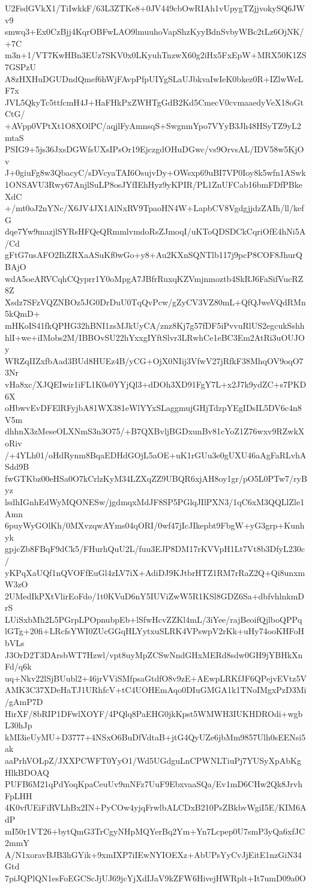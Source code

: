 U2FsdGVkX1/TiIwkkF/63L3ZTKe8+0JV449cbOwRIAh1vUpygTZjjvokySQ6JWv9
smwq3+Ex0CzBjj4KqrOBFwLAO9lmuuhoVapShzKyyBdnSvbyWBc2tLz6OjNK/+7C
m3n+1/VT7KwHBn3EUz7SKV0x0LKyuhTnzwX60g2iHx5FxEpW+MRX50K1ZS7GSPzU
A8zHXHuDGUDndQmef6hWjFAvpPfpUIYgSLaUJbkvaIwIeK0bkez0R+IZlwWeLF7x
JVL5QkyTc5ttfcmH4J+HaFHkPxZWHTgGdB2Kd5CmecV0cvmaaedyVeX18oGtCtG/
+AVpp0VPtXt1O8XOlPC/aqjlFyAmnsqS+SwgnmYpo7VYyB3Jh48HSyTZ9yL2mtaS
PSIG9+5js36JxsDGWfsUXsIPsOr19EjczgdOHuDGwc/vs9OrvsAL/IDV58w5KjOv
J+0giuFg8w3QbacyC/sDVcyaTAI6OsujvDy+OWsxp69uBI7VP0Ioy8k5wfn1ASwk
1ONSAVU3Rwy67AnjlSuLP8osJYfIEhHyz9yKPIR/PL1ZnUFCab16bmFDfPBkeXdC
+/mt0oJ2nYNc/X6JV4JX1AlNxRV9TpaoHN4W+LapbCV8VgdgjjdzZAIh/ll/kefG
dqe7Yw9mazjlSYRsHFQeQRmmlvmdoRsZJmoqI/uKToQDSDCkCqriOfE4hNi5A/Cd
gFtG7usAFO2IhZRXaASuKf0wGo+y8+Au2KXnSQNTlb117j9pcP8COF8JhurQBAjO
wdA5oeARVCqhCQyprr1Y0oMpgA7JBfrRuxqKZVmjnmoztb4SkRJ6FaSifVucRZ8Z
Xsdz7SFzVQZNBOz5JG0DrDuU0TqQvPcw/gZyCV3VZ80mL+QfQJweVQdRMn5kQmD+
mHKoIS41fkQPHG32hBNI1zsMJkUyCA/znz8Kj7g57fDF5iPvvuRlUS2egcukSshh
hlI+we+iIMobs2M/IBBOvSU22hYxxgIYftSlvr3LRwhCe1eBC3Em2AtRi3uOUJOy
WRZqIIZxfbAad3BUd8HUEz4B/yCG+OjX0NIij3VfwV27jRfkF38MhqOV9oqO73Nr
vHa8xc/XJQEIwir1iFL1K0s0YYjQl3+dDOh3XD91FgY7L+x2J7k9ydZC+s7PKD6X
oHbwvEvDFElRFyjbA81WX381eWlYYxSLaggmujGHjTdzpYEgIDsIL5DV6c4n8V5m
dhhnX3zMeseOLXNmS3n3O75/+B7QXBvljBGDxunBv81cYoZ1Z76wxv9RZwkXoRiv
/+4YLh01/oHdRynm8BqaEDHdGOjL5aOE+uK1rGUu3e0gUXU46aAgFaRLvhASdd9B
fwGTKbz00eHSa0O7kCrlzKyM34LZXqZZ9UBQR6xjAH8oy1gr/pO5L0PTw7/ryByz
lsdhIGnhEdWyMQONESw/jgdmqxMdJF8SP5PGlqJIlPXN3/1qC6xM3QQLlZle1Amn
6puyWyGOlKh/0MXvzqwAYms04qORI/0wf47jIcJIkepbt9FbgW+yG3grp+Kunhyk
gpjcZb8FBqF9dCk5/FHurhQuU2L/fuu3EJP8DM17rKVVpH1Lt7Vt8b3DfyL230c/
yKPqXaUQf1nQVOFfEuGl4zLV7iX+AdiDJ9KJtbrHTZ1RM7rRaZ2Q+Qi8unxmW3zO
2UMedIkPXtVlirEoFdo/1t0KVuD6nY5IUViZwW5R1KSl8GDZ6Sa+dbfvhlnkmDrS
LUiSxbMh2L5PGrpLPOpnubpEb+lSfwHcvZZKl4mL/3iYee/rajBeoifQjlboQPPq
lGTg+20fi+LRcfsYWI0ZUcGGqHLYytxuSLRK4VPswpV2rKk+uHy74ooKHFoHbVLs
J3OrD2T3DArsbWT7Hzwl/vpt8uyMpZCSwNndGHxMERd8sdw0GH9jYBHkXnFd/q6k
uq+Nkv22lSjBUubl2+46jrVViSMfpsaGtdfO8v9zE+AEwpLRKfJF6QPejvEVtz5V
AMK3C37XDeHaTJ1URhfcV+tC4UOHEmAqo0DIuGMGA1k1TNoIMgxPzD3Mi/gAmP7D
HirXF/8bRIP1DFwlXOYF/4PQlq8PaEHG0jkKpst5WMWH3IUKHDROdi+wgbL30hJp
kMI3ieUyMU+D3777+4NSxO6BuDfVdtaB+jtG4QyUZe6jbMm9857Ulh0sEENsi5ak
aaPrhVOLpZ/JXXPCWFT0YyO1/Wd5UGdguLnCPWNLTiuPj7YUSyXpAbKgHlkBDOAQ
PUFB6M21qPdYoqKpaCeuUv9mNFz7UuF9EbxvaaSQa/Ev1mD6CHw2Qk8JrvhFpLHH
4K0vfUEiFiRVLhBx2IN+PyCOw4yjqFrwlbALCDxB210PsZBkbvWgiI5E/KIM6AdP
mI50r1VT26+bytQmG3TrCgyNHpMQYerBq2Ym+Yn7Lcpep0U7smP3yQa6xfJC2mmY
A/N1xoravBJB3hGYik+9xmIXP7iIEwNYIOEXz+AbUPsYyCvJjEitE1nzGiN34Gtd
7piJQPlQN1esFoEGCScJjUJ69jcYjXdIJaV9kZFW6HivejHWRplt+It7umD09a0O
